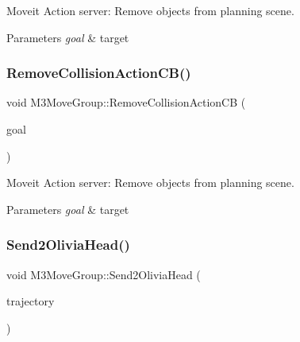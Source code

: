 Moveit Action server\+: Remove objects from planning scene. 


\begin{DoxyParams}{Parameters}
{\em goal} & target \\
\hline
\end{DoxyParams}
\mbox{\label{classM3MoveGroup_afad468e11f51e093ef704ebe974ecc28}} 
\subsubsection{\texorpdfstring{Remove\+Collision\+Action\+C\+B()}{RemoveCollisionActionCB()}\hspace{0.1cm}{\footnotesize\ttfamily [2/2]}}
{\footnotesize\ttfamily void M3\+Move\+Group\+::\+Remove\+Collision\+Action\+CB (\begin{DoxyParamCaption}\item[{const m3\+\_\+moveit\+::\+Moveit\+Collide\+Goal\+Const\+Ptr \&}]{goal }\end{DoxyParamCaption})\hspace{0.3cm}{\ttfamily [inline]}}



Moveit Action server\+: Remove objects from planning scene. 


\begin{DoxyParams}{Parameters}
{\em goal} & target \\
\hline
\end{DoxyParams}
\mbox{\label{classM3MoveGroup_a5f4c7d0260a2d987e5abaf1b1365c657}} 
\subsubsection{\texorpdfstring{Send2\+Olivia\+Head()}{Send2OliviaHead()}\hspace{0.1cm}{\footnotesize\ttfamily [1/2]}}
{\footnotesize\ttfamily void M3\+Move\+Group\+::\+Send2\+Olivia\+Head (\begin{DoxyParamCaption}\item[{moveit\+\_\+msgs\+::\+Robot\+Trajectory}]{trajectory }\end{DoxyParamCaption})\hspace{0.3cm}{\ttfamily [inline]}}



